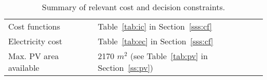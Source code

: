 \begin{table}[htp]
	\centering
	\caption{Summary of relevant cost and decision constraints.}
	\label{tab:cc}
	\begin{tabular}{ll}
		\toprule
		Cost functions         & Table~\ref{tab:ic} in Section~\ref{sss:cf}         \\
		Electricity cost       & Table~\ref{tab:ec} in Section~\ref{sss:cf}       \\
		Max. PV area available & 2170 $m^2$ (see Table~\ref{tab:pv} in Section~\ref{ss:pv})\\ 
		\bottomrule
	\end{tabular}
\end{table}